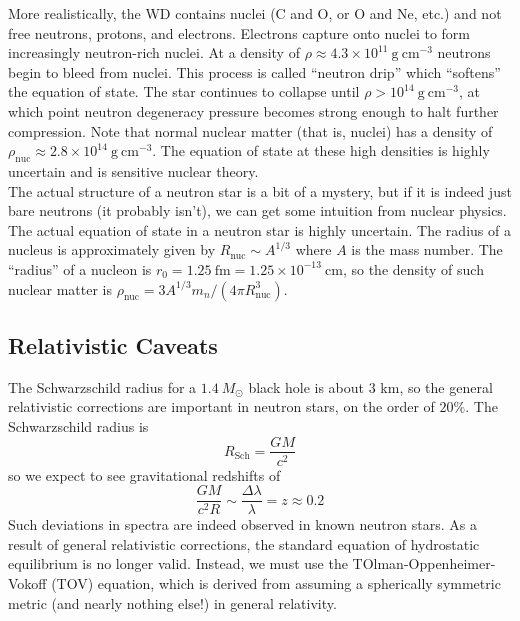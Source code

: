 \documentclass[10pt]{article}
\numberwithin{equation}{section}
\newcommand{\n}{\noindent}
\begin{document}
	\n More realistically, the WD contains nuclei (C and O, or O and Ne, etc.) and not free neutrons, protons, and electrons. Electrons capture onto nuclei to form increasingly neutron-rich nuclei. At a density of $\rho \approx 4.3\times 10^{11}\ \mathrm{g\ cm^{-3}}$ neutrons begin to bleed from nuclei. This process is called ``neutron drip'' which ``softens'' the equation of state. The star continues to collapse until $\rho>10^{14}\ \mathrm{g\ cm^{-3}}$, at which point neutron degeneracy pressure becomes strong enough to halt further compression. Note that normal nuclear matter (that is, nuclei) has a density of $\rho_{\mathrm{nuc}}\approx 2.8\times 10^{14}\ \mathrm{g\ cm^{-3}}$. The equation of state at these high densities is highly uncertain and is sensitive nuclear theory.\\
	
	\n The actual structure of a neutron star is a bit of a mystery, but if it is indeed just bare neutrons (it probably isn't), we can get some intuition from nuclear physics. The actual equation of state in a neutron star is highly uncertain. The radius of a nucleus is approximately given by $R_{\mathrm{nuc}}\sim A^{1/3}$ where $A$ is the mass number. The ``radius'' of a nucleon is $r_0 = 1.25\ \mathrm{fm}=1.25\times 10^{-13}\ \mathrm{cm}$, so the density of such nuclear matter is $\rho_{\mathrm{nuc}} = 3 A^{1/3}m_n/(4\pi R_{\mathrm{nuc}}^3)$.
	\subsection{Relativistic Caveats} %
	\label{sub:relativistic_caveats}
	 The Schwarzschild radius for a $1.4\ M_\odot$ black hole is about 3 km, so the general relativistic corrections are important in neutron stars, on the order of $20\%$. The Schwarzschild radius is
	\begin{equation}
		\label{eq:relativistic:1} R_{\mathrm{Sch}} = \frac{GM}{c^2}
	\end{equation}
	so we expect to see gravitational redshifts of 
	\begin{equation}
		\label{eq:relativistic:2} \frac{GM}{c^2R} \sim \frac{\Delta \lambda}{\lambda} = z \approx 0.2
	\end{equation}
	Such deviations in spectra are indeed observed in known neutron stars. As a result of general relativistic corrections, the standard equation of hydrostatic equilibrium is no longer valid. Instead, we must use the TOlman-Oppenheimer-Vokoff (TOV) equation, which is derived from assuming a spherically symmetric metric (and nearly nothing else!) in general relativity.\\
	
\end{document}
